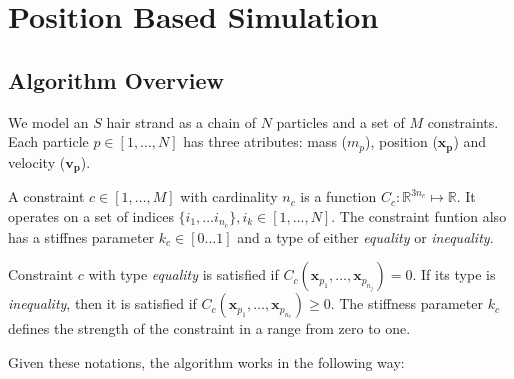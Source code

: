 \documentclass[sigplan,screen,nonacm]{acmart}
\begin{document}
\section{Position Based Simulation}

\subsection{Algorithm Overview}

We model an $S$ hair strand as a chain of $N$ particles and a set of $M$
constraints. Each particle $p \in [1,\ldots,N]$ has three atributes: mass ($m_p$), position
($\boldsymbol{x_p}$) and velocity ($\boldsymbol{v_p}$). 

A constraint $c \in [1,\ldots,M]$ with cardinality $n_c$ is a function $C_c
: \mathbb{R} ^{3n_c} \mapsto \mathbb{R}$. It operates on a set of indices $\{i_1,\ldots
i_{n_c}\}, i_k \in [1,...,N]$. The constraint funtion also has a stiffnes
parameter $k_c \in [0...1]$ and a type of either \emph{equality} or
\emph{inequality}.

Constraint $c$ with type \emph{equality} is satisfied if
$C_c(\boldsymbol{x}_{p_1},\ldots, \boldsymbol{x}_{p_{n_j}})=0$. If its type is
\emph{inequality}, then it is satisfied if $C_c(\boldsymbol{x}_{p_1}, \ldots,
\boldsymbol{x}_{p_{n_c}}) \geq 0$. The stiffness parameter $k_c$ defines the
strength of the constraint in a range from zero to one.

Given these notations, the algorithm works in the following way:
\end{document}
